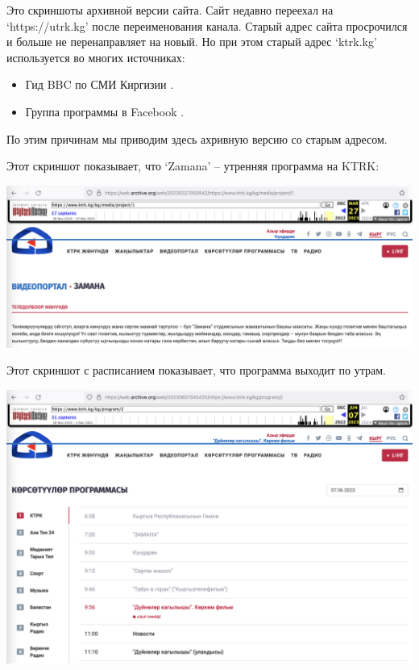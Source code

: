 
Это скриншоты архивной версии сайта.
Сайт недавно переехал на `https://utrk.kg' после переименования канала.
Старый адрес сайта просрочился и больше не перенаправляет на новый.
Но при этом старый адрес `ktrk.kg' используется во многих источниках:

\begin{itemize}
    \item Гид BBC по СМИ Киргизии .
    \item Группа программы в Facebook .
\end{itemize}

По этим причинам мы приводим здесь ахривную версию со старым адресом.

Этот скриншот показывает, что `Zamana' -- утренняя программа на KTRK:

\begin{center}
    \includegraphics[width=\textwidth]{ktrk-zamana}
\end{center}
\pagebreak



Этот скриншот с расписанием показывает, что программа выходит по утрам.

\begin{center}
    \includegraphics[width=\textwidth]{ktrk-schedule}
\end{center}



\pagebreak
